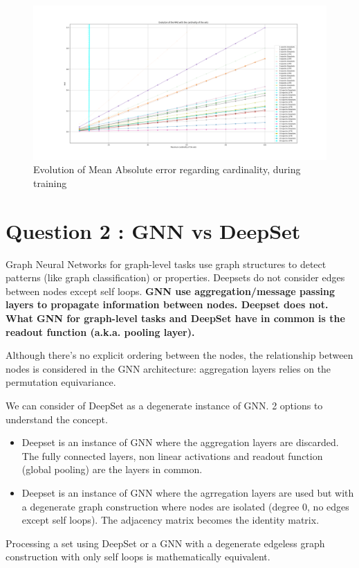 \documentclass[a4paper]{article}
\begin{document}
\begin{figure}[h]
    \centering
    \includegraphics[width=1.\textwidth]{figures/deep_set_performances_MAE_evol.png}
    \caption{Evolution of Mean Absolute error regarding cardinality, during training}
    \label{fig:mean_absolute_error_deepset_lstm_evolution}
\end{figure}


\section*{Question 2 : GNN vs DeepSet}
Graph Neural Networks for graph-level tasks use graph structures to detect patterns (like graph classification) or properties. Deepsets do not consider edges between nodes except self loops.
\textbf{GNN use aggregation/message passing layers to propagate information between nodes. Deepset does not.}
\newline
\textbf{What GNN for graph-level tasks and DeepSet have in common is the readout function (a.k.a. pooling layer).}

Although there's no explicit ordering between the nodes, the relationship between nodes is considered in the GNN architecture: aggregation layers relies on the permutation equivariance.

We can consider of DeepSet as a degenerate instance of GNN. 2 options to understand the concept.
\begin{itemize}
    \item Deepset is an instance of GNN where the aggregation layers are discarded. The fully connected layers, non linear activations and readout function (global pooling) are the layers in common.
    \item Deepset is an instance of GNN where the agrregation layers are used but with a degenerate graph construction where nodes are isolated (degree 0, no edges except self loops). The adjacency matrix becomes the identity matrix.
\end{itemize}
Processing a set using DeepSet or a GNN with a degenerate edgeless graph construction with only self loops is mathematically equivalent.
\end{document}
